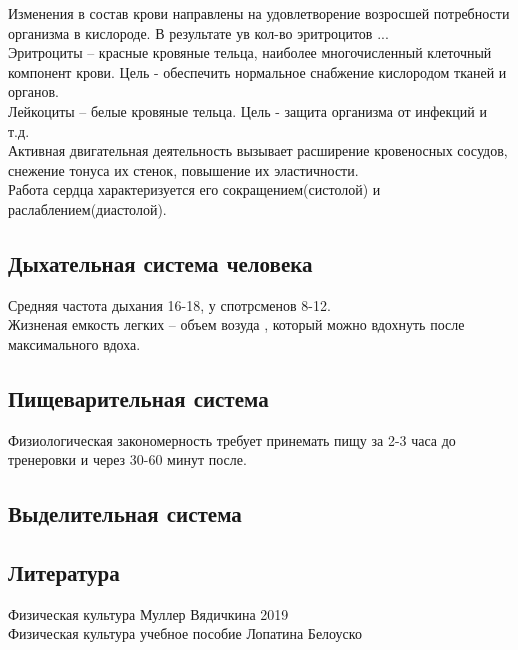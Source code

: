 \documentclass[a4paper, 12pt]{article}
\begin{document}
Изменения в состав крови направлены на удовлетворение возросшей потребности организма в кислороде. В результате ув кол-во эритроцитов ... \\

Эритроциты -- красные кровяные тельца, наиболее многочисленный клеточный компонент крови. Цель - обеспечить нормальное снабжение кислородом тканей и органов.\\

Лейкоциты -- белые кровяные тельца. Цель - защита организма от инфекций и т.д.\\

Активная двигательная деятельность вызывает расширение кровеносных сосудов, снежение тонуса их стенок, повышение их эластичности.\\

Работа сердца характеризуется его сокращением(систолой) и раслаблением(диастолой).\\

\subsection*{Дыхательная система человека}

Средняя частота дыхания 16-18, у спотрсменов 8-12.\\

Жизненая емкость легких -- объем возуда , который можно вдохнуть после максимального вдоха.\\

\subsection*{Пищеварительная система}

Физиологическая закономерность требует принемать пищу за 2-3 часа до тренеровки и через 30-60 минут после.\\

\subsection*{Выделительная система}












\newpage
\subsection*{Литература} 
Физическая культура Муллер Вядичкина 2019\\
Физическая культура учебное пособие Лопатина Белоуско \\ 
\end{document}

